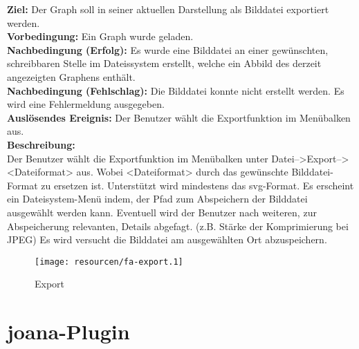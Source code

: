 \label{fa:export_img}
\textbf{Ziel:} Der Graph soll in seiner aktuellen Darstellung als Bilddatei exportiert werden.\\
\textbf{Vorbedingung:} Ein Graph wurde geladen. \\
\textbf{Nachbedingung (Erfolg):} Es wurde eine Bilddatei an einer gewünschten, schreibbaren Stelle im Dateissystem erstellt, welche ein Abbild des derzeit angezeigten Graphens enthält.\\
\textbf{Nachbedingung (Fehlschlag):} Die Bilddatei konnte nicht erstellt werden. Es wird eine Fehlermeldung ausgegeben.\\
\textbf{Auslösendes Ereignis:}
Der Benutzer wählt die Exportfunktion im Menübalken aus.\\
\textbf{Beschreibung:}\\
Der Benutzer wählt die Exportfunktion im Menübalken unter Datei-->Export--><Dateiformat> aus. Wobei <Dateiformat> durch das gewünschte Bilddatei-Format zu ersetzen ist. Unterstützt wird mindestens das \gls{svg}-Format. %
Es erscheint ein Dateisystem-Menü indem, der Pfad zum Abspeichern der Bilddatei ausgewählt werden kann.
Eventuell wird der Benutzer nach weiteren, zur Abspeicherung relevanten, Details abgefagt. (z.B. Stärke der Komprimierung bei JPEG) %
Es wird versucht die Bilddatei am ausgewählten Ort abzuspeichern.\\

\begin{figure}[ht]
  \centering
  \texttt{[image: resourcen/fa-export.1]}
  \caption{Export}
  \label{fig:export}
\end{figure}

\section{\gls{joana}-Plugin}



